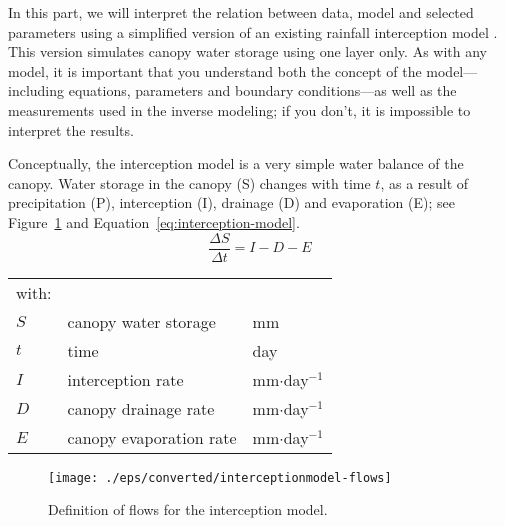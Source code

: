 In this part, we will interpret the relation between data, model and selected parameters using a simplified version of an existing rainfall interception model \citep{bout-scha-aert-verm1996}. This version simulates canopy water storage using one layer only. As with any model, it is important that you understand both the concept of the model---including equations, parameters and boundary conditions---as well as the measurements used in the inverse modeling; if you don't, it is impossible to interpret the results.

Conceptually, the interception model is a very simple water balance of the canopy. Water storage in the canopy (S) changes with time $t$, as a result of precipitation (P), interception (I), drainage (D) and evaporation (E); see Figure~\ref{fig:interception-model-flows} and Equation~\ref{eq:interception-model}.
\begin{equation}
\label{eq:interception-model}
\frac{\Delta S}{\Delta t} = I-D-E
\end{equation}
\begin{tabular}{lll}
with:&&\\
$S$&canopy water storage&\textsf{mm}\\
$t$&time&\textsf{day}\\
$I$&interception rate&\textsf{mm$\cdot{}$day$^{-1}$}\\
$D$&canopy drainage rate&\textsf{mm$\cdot{}$day$^{-1}$}\\
$E$&canopy evaporation rate&\textsf{mm$\cdot{}$day$^{-1}$}\\
\end{tabular}

\begin{figure}[htbp]
  \centering
    \texttt{[image: ./eps/converted/interceptionmodel-flows]}
  \caption{Definition of flows for the interception model.}
  \label{fig:interception-model-flows}
\end{figure}

